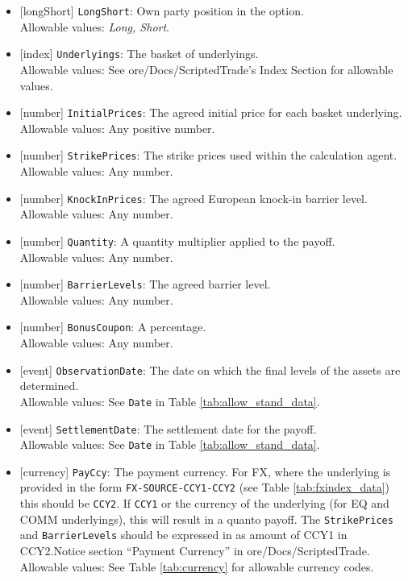 \begin{itemize}
  \item{}[longShort] \lstinline!LongShort!: Own party position in the option. \\
  Allowable values: \emph{Long, Short}.
  \item{}[index] \lstinline!Underlyings!: The basket of underlyings. \\
  Allowable values: See ore/Docs/ScriptedTrade's Index Section for allowable values.
  \item{}[number] \lstinline!InitialPrices!: The agreed initial price for each basket underlying. \\
  Allowable values: Any positive number.
  \item{}[number] \lstinline!StrikePrices!: The strike prices used within the calculation agent. \\
  Allowable values: Any number.
  \item{}[number] \lstinline!KnockInPrices!: The agreed European knock-in barrier level. \\
  Allowable values: Any number.
  \item{}[number] \lstinline!Quantity!: A quantity multiplier applied to the payoff. \\
  Allowable values: Any number.
  \item{}[number] \lstinline!BarrierLevels!: The agreed barrier level. \\
  Allowable values: Any number.
  \item{}[number] \lstinline!BonusCoupon!: A percentage. \\
  Allowable values: Any number.
  \item{}[event] \lstinline!ObservationDate!: The date on which the final levels of the assets are determined. \\
  Allowable values: See \lstinline!Date! in Table \ref{tab:allow_stand_data}.
  \item{}[event] \lstinline!SettlementDate!: The settlement date for the payoff. \\
  Allowable values: See \lstinline!Date! in Table \ref{tab:allow_stand_data}.
  \item{}[currency] \lstinline!PayCcy!: The payment currency. For FX, where the underlying is provided
      in the form \lstinline!FX-SOURCE-CCY1-CCY2! (see Table \ref{tab:fxindex_data}) this should
      be \lstinline!CCY2!. If \lstinline!CCY1! or the currency of the underlying (for EQ and
      COMM underlyings), this will result in a quanto payoff. The \lstinline!StrikePrices! and \lstinline!BarrierLevels! should be expressed in
      as amount of CCY1 in CCY2.Notice section ``Payment Currency'' in ore/Docs/ScriptedTrade. \\
        Allowable values: See Table \ref{tab:currency} for allowable currency codes.
\end{itemize}

